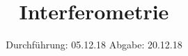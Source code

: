 

\subject{V 64}
\title{Interferometrie}
\date{
  Durchführung: 05.12.18
  \hspace{3em}
  Abgabe: 20.12.18
}



\maketitle
\thispagestyle{empty}
\tableofcontents
\newpage
\setcounter{page}{1}






\printbibliography


